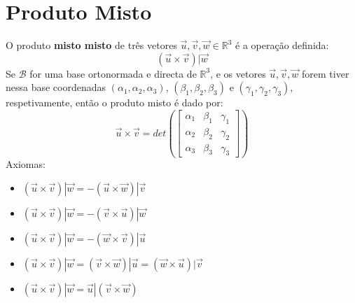 \documentclass[]{report}
\begin{document}
\section{Produto Misto}
O produto \textbf{misto misto} de três vetores $\vec u, \vec v, \vec w \in \mathbb{R}^3$ é a operação definida:
$$(\vec u \times \vec v) | \vec w$$
Se $\mathcal{B}$ for uma base ortonormada e directa de $\mathbb{R}^3$, e os vetores $\vec u, \vec v, \vec w$ forem tiver nessa base coordenadas $(\alpha_1, \alpha_2, \alpha_3)$, 
$(\beta_1, \beta_2, \beta_3)$ e $(\gamma_1, \gamma_2, \gamma_3)$, respetivamente, então o produto misto é dado por:
$$\vec u \times \vec v = det\left(
\begin{bmatrix}
\alpha_1 & \beta_1 & \gamma_1\\
\alpha_2 & \beta_2 & \gamma_2\\
\alpha_3 & \beta_3 & \gamma_3
\end{bmatrix}
\right)$$
Axiomas:
\begin{itemize}
\item $(\vec u \times \vec v)|\vec w = -(\vec u \times \vec w)|\vec v$
\item $(\vec u \times \vec v)|\vec w = -(\vec v \times \vec u)|\vec w$
\item $(\vec u \times \vec v)|\vec w = -(\vec w \times \vec v)|\vec u$
\item $(\vec u \times \vec v)|\vec w = (\vec v \times \vec w)|\vec u = (\vec w \times \vec u)|\vec v$
\item $(\vec u \times \vec v)|\vec w = \vec u|(\vec v \times \vec w)$
\end{itemize}
\end{document}
